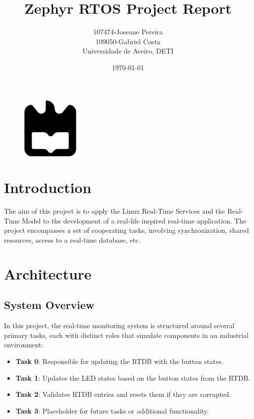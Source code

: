 \documentclass[a4paper,12pt]{article}
\title{Zephyr RTOS Project Report}
\author{
107474-Joseane Pereira \\
109050-Gabriel Costa \\
Universidade de Aveiro, DETI
}
\date{\today}
\begin{document}
\begin{figure}
    \centering
    \includegraphics[width=0.3\linewidth]{ua.pdf}
    \label{fig:enter-label}
\end{figure}
\maketitle
\newpage
\tableofcontents
\newpage

\section{Introduction}
The aim of this project is to apply the Linux Real-Time Services and the Real-Time Model to the development of a real-life inspired real-time application. The project encompasses a set of cooperating tasks, involving synchronization, shared resources, access to a real-time database, etc.

\section{Architecture}
\subsection{System Overview}
In this project, the real-time monitoring system is structured around several primary tasks, each with distinct roles that simulate components in an industrial environment:
\begin{itemize}
    \item \textbf{Task 0}: Responsible for updating the RTDB with the button states.
    \item \textbf{Task 1}: Updates the LED states based on the button states from the RTDB.
    \item \textbf{Task 2}: Validates RTDB entries and resets them if they are corrupted.
    \item \textbf{Task 3}: Placeholder for future tasks or additional functionality.
\end{itemize}
\end{document}
